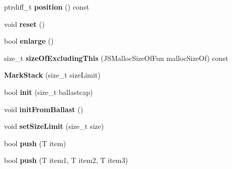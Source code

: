 \begin{DoxyCompactItemize}
\item 
\hypertarget{structjs_1_1_mark_stack_a22dc09fef76a70c5be516fa532019e15}{ptrdiff\-\_\-t {\bfseries position} () const }\label{structjs_1_1_mark_stack_a22dc09fef76a70c5be516fa532019e15}

\item 
\hypertarget{structjs_1_1_mark_stack_a47d121a4666e40e423b464c06e143910}{void {\bfseries reset} ()}\label{structjs_1_1_mark_stack_a47d121a4666e40e423b464c06e143910}

\item 
\hypertarget{structjs_1_1_mark_stack_a6adeb4ef48ba6e128fca1af984d48e14}{bool {\bfseries enlarge} ()}\label{structjs_1_1_mark_stack_a6adeb4ef48ba6e128fca1af984d48e14}

\item 
\hypertarget{structjs_1_1_mark_stack_a24bb17032778d7b06e39074f5152f677}{size\-\_\-t {\bfseries size\-Of\-Excluding\-This} (J\-S\-Malloc\-Size\-Of\-Fun malloc\-Size\-Of) const }\label{structjs_1_1_mark_stack_a24bb17032778d7b06e39074f5152f677}

\item 
\hypertarget{structjs_1_1_mark_stack_ae0a63c910e6728c8d3d07e0a29966a7b}{{\bfseries Mark\-Stack} (size\-\_\-t size\-Limit)}\label{structjs_1_1_mark_stack_ae0a63c910e6728c8d3d07e0a29966a7b}

\item 
\hypertarget{structjs_1_1_mark_stack_aed7dd68474502d702e24986935506cc7}{bool {\bfseries init} (size\-\_\-t ballastcap)}\label{structjs_1_1_mark_stack_aed7dd68474502d702e24986935506cc7}

\item 
\hypertarget{structjs_1_1_mark_stack_ad920d3bef00bd9ae1bfd49cef626070c}{void {\bfseries init\-From\-Ballast} ()}\label{structjs_1_1_mark_stack_ad920d3bef00bd9ae1bfd49cef626070c}

\item 
\hypertarget{structjs_1_1_mark_stack_ad8924423f212ff1a5174d0521ec78ced}{void {\bfseries set\-Size\-Limit} (size\-\_\-t size)}\label{structjs_1_1_mark_stack_ad8924423f212ff1a5174d0521ec78ced}

\item 
\hypertarget{structjs_1_1_mark_stack_a38060cf702ee4fe09c68f34eaa409f8d}{bool {\bfseries push} (T item)}\label{structjs_1_1_mark_stack_a38060cf702ee4fe09c68f34eaa409f8d}

\item 
\hypertarget{structjs_1_1_mark_stack_a0996613422ac9502d716e8774a895e76}{bool {\bfseries push} (T item1, T item2, T item3)}\label{structjs_1_1_mark_stack_a0996613422ac9502d716e8774a895e76}


\end{DoxyCompactItemize}
